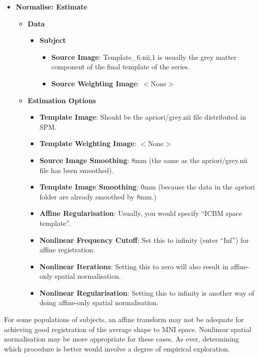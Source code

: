 \begin{itemize}
\item{{\bf Normalise: Estimate}
  \begin{itemize}
  \item{{\bf Data}
    \begin{itemize}
    \item{{\bf Subject}
      \begin{itemize}
      \item{{\bf Source Image}: Template\_6.nii,1 is usually the grey matter component of the final template of the series.}
      \item{{\bf Source Weighting Image}: $<$None$>$}
      \end{itemize}
    }
    \end{itemize}
  }
  \item{{\bf Estimation Options}
    \begin{itemize}
    \item{{\bf Template Image}: Should be the apriori/grey.nii file distributed in SPM.}
    \item{{\bf Template Weighting Image}: $<$None$>$}
    \item{{\bf Source Image Smoothing}: 8mm (the same as the apriori/grey.nii file has been smoothed).}
    \item{{\bf Template Image Smoothing}: 0mm (because the data in the apriori folder are already smoothed by 8mm.)}
    \item{{\bf Affine Regularisation}: Usually, you would specify ``ICBM space template''.}
    \item{{\bf Nonlinear Frequency Cutoff}: Set this to infinity (enter ``Inf'') for affine registration.}
    \item{{\bf Nonlinear Iterations}: Setting this to zero will also result in affine-only spatial normalisation.}
    \item{{\bf Nonlinear Regularisation}: Setting this to infinity is another way of doing affine-only spatial normalisation.}
    \end{itemize}
  }
  \end{itemize}
}
\end{itemize}

For some populations of subjects, an affine transform may not be adequate for achieving good registration of the average shape to MNI space.
Nonlinear spatial normalisation may be more appropriate for these cases.
As ever, determining which procedure is better would involve a degree of empirical exploration.

